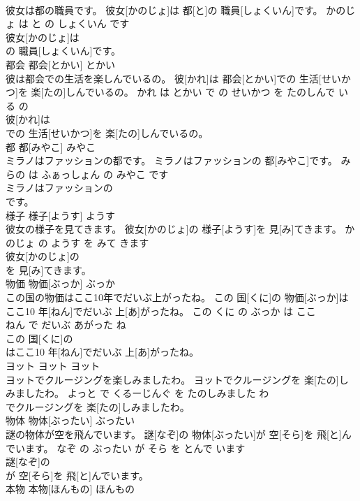 \documentclass[8pt]{extreport}
\begin{document}
\begin{CJK}{UTF8}{min}
\\	彼女は都の職員です。	彼女[かのじょ]は 都[と]の 職員[しょくいん]です。	かのじょ は と の しょくいん です	
\\	彼女[かのじょ]は
\\	の 職員[しょくいん]です。			
\\	都会	都会[とかい]	とかい	
\\	彼は都会での生活を楽しんでいるの。	彼[かれ]は 都会[とかい]での 生活[せいかつ]を 楽[たの]しんでいるの。	かれ は とかい で の せいかつ を たのしんで いる の	
\\	彼[かれ]は
\\	での 生活[せいかつ]を 楽[たの]しんでいるの。			
\\	都	都[みやこ]	みやこ	
\\	ミラノはファッションの都です。	ミラノはファッションの 都[みやこ]です。	みらの は ふぁっしょん の みやこ です	
\\	ミラノはファッションの
\\	です。			
\\	様子	様子[ようす]	ようす	
\\	彼女の様子を見てきます。	彼女[かのじょ]の 様子[ようす]を 見[み]てきます。	かのじょ の ようす を みて きます	
\\	彼女[かのじょ]の
\\	を 見[み]てきます。			
\\	物価	物価[ぶっか]	ぶっか	
\\	この国の物価はここ10年でだいぶ上がったね。	この 国[くに]の 物価[ぶっか]はここ10 年[ねん]でだいぶ 上[あ]がったね。	この くに の ぶっか は ここ 
\\	ねん で だいぶ あがった ね	
\\	この 国[くに]の
\\	はここ10 年[ねん]でだいぶ 上[あ]がったね。			
\\	ヨット	ヨット	ヨット	
\\	ヨットでクルージングを楽しみましたわ。	ヨットでクルージングを 楽[たの]しみましたわ。	よっと で くるーじんぐ を たのしみました わ	
\\	でクルージングを 楽[たの]しみましたわ。			
\\	物体	物体[ぶったい]	ぶったい	
\\	謎の物体が空を飛んでいます。	謎[なぞ]の 物体[ぶったい]が 空[そら]を 飛[と]んでいます。	なぞ の ぶったい が そら を とんで います	
\\	謎[なぞ]の
\\	が 空[そら]を 飛[と]んでいます。			
\\	本物	本物[ほんもの]	ほんもの	

\end{CJK}
\end{document}
